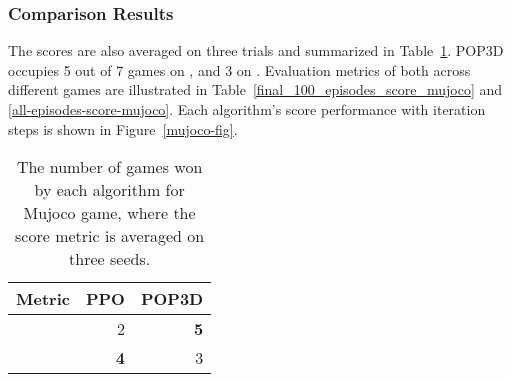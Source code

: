 \documentclass{article}
\begin{document}
\subsubsection{Comparison Results}

The scores are also averaged on three trials and summarized in Table~\ref{comparison_summary}. POP3D occupies 5 out of 7 games on , and  3  on . Evaluation metrics of both across different games are illustrated in  Table~\ref{final_100_episodes_score_mujoco} and \ref{all-episodes-score-mujoco}. Each algorithm's score performance with iteration steps is shown in Figure~\ref{mujoco-fig}.
\begin{table}
	\begin{center}
		\begin{tabular}{lrr}
			\toprule
			Metric& PPO & POP3D \\
			\midrule
			  &2 &  \textbf{5} \\
			   & \textbf{4} &3\\
			\bottomrule
		\end{tabular}
	\end{center}
	\caption{The number of games won by each algorithm for Mujoco game, where the score metric is averaged on three seeds.}
	\label{comparison_summary}
\end{table} 
\end{document}
